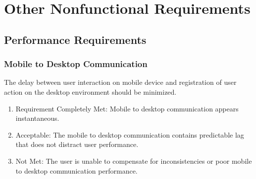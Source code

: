 \documentclass{article}
\begin{document}


\newpage
\section{Other Nonfunctional Requirements}
\subsection{Performance Requirements}
\subsubsection{Mobile to Desktop Communication}
The delay between user interaction on mobile device and registration of user action on the desktop environment should be minimized.
\begin{enumerate}
    \item Requirement Completely Met: Mobile to desktop communication appears instantaneous.
    \item Acceptable: The mobile to desktop communication contains predictable lag that does not distract user performance.
    \item Not Met: The user is unable to compensate for inconsistencies or poor mobile to desktop communication performance.
\end{enumerate}
\end{document}
